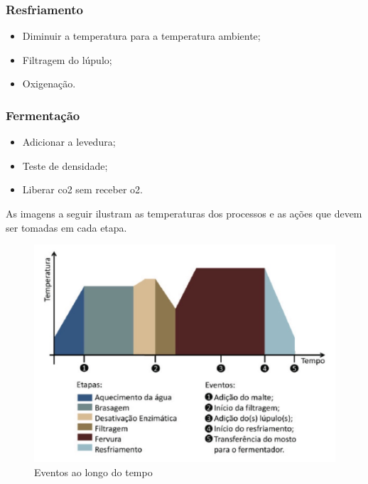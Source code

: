 \subsubsection{Resfriamento}
\begin{itemize}
    \item Diminuir a temperatura para a temperatura ambiente;
    \item Filtragem do lúpulo;
    \item Oxigenação.
\end{itemize}


\subsubsection{Fermentação}
\begin{itemize}
    \item Adicionar a levedura;
    \item Teste de densidade;
    \item Liberar co2 sem receber o2.
\end{itemize}

\clearpage
As imagens a seguir ilustram as temperaturas dos processos e as ações que devem ser tomadas em cada etapa.

\begin{figure}[h]
    \centering
    \includegraphics[scale=0.2]{images/grafico1.png}
    \caption{Eventos ao longo do tempo}
\end{figure}

